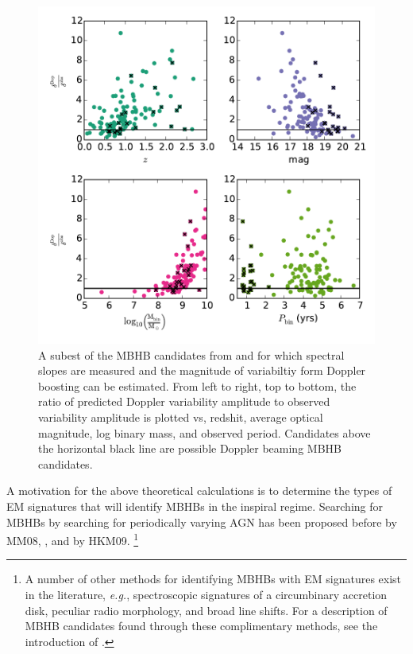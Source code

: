 \begin{figure}
\begin{center}
\includegraphics[scale=0.55]{figures/ch0/PTF_xsiGtr1_vs_z_M_P_alph_I90} 
\end{center}
\caption{A subest of the MBHB candidates from \citep{Graham+2015b} and \citep[][denoted by black x's]{Charisi+2016} for which spectral slopes are measured and the magnitude of variabiltiy form Doppler boosting can be estimated. From left to right, top to bottom, the ratio of predicted Doppler variability amplitude to observed variability amplitude is plotted vs, redshit, average optical magnitude, log binary mass, and observed period. Candidates above the horizontal black line are possible Doppler beaming MBHB candidates.}
\label{Fig:DopCan}
\end{figure}


A motivation for the above theoretical calculations is to
determine the types of EM signatures that will identify MBHBs in the inspiral
regime. Searching for MBHBs by searching for periodically varying AGN has been
proposed before by MM08, \cite{Haiman+2009}, and by HKM09. \footnote{A number
of other methods for identifying MBHBs with EM signatures exist in the
literature, \emph{e.g.}, spectroscopic signatures of a circumbinary accretion
disk, peculiar radio morphology, and broad line shifts. For a description of
MBHB candidates found through these complimentary methods, see the
introduction of \cite{Charisi+2016}.}
 

